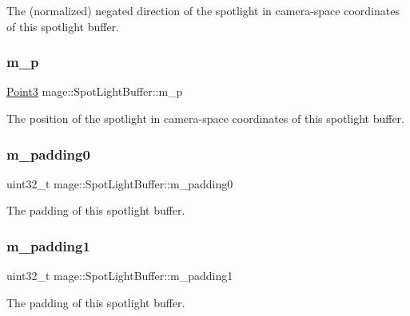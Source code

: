 The (normalized) negated direction of the spotlight in camera-\/space coordinates of this spotlight buffer. \hypertarget{structmage_1_1_spot_light_buffer_a6cb32b6089b90aa937df99bb794884e3}{}\label{structmage_1_1_spot_light_buffer_a6cb32b6089b90aa937df99bb794884e3} 
\subsubsection{\texorpdfstring{m\+\_\+p}{m\_p}}
{\footnotesize\ttfamily \hyperlink{structmage_1_1_point3}{Point3} mage\+::\+Spot\+Light\+Buffer\+::m\+\_\+p}

The position of the spotlight in camera-\/space coordinates of this spotlight buffer. \hypertarget{structmage_1_1_spot_light_buffer_a8a5110d1427ca192cee7751ae8aeabab}{}\label{structmage_1_1_spot_light_buffer_a8a5110d1427ca192cee7751ae8aeabab} 
\subsubsection{\texorpdfstring{m\+\_\+padding0}{m\_padding0}}
{\footnotesize\ttfamily uint32\+\_\+t mage\+::\+Spot\+Light\+Buffer\+::m\+\_\+padding0}

The padding of this spotlight buffer. \hypertarget{structmage_1_1_spot_light_buffer_a60369775901f4536a28cc35ab2275bd8}{}\label{structmage_1_1_spot_light_buffer_a60369775901f4536a28cc35ab2275bd8} 
\subsubsection{\texorpdfstring{m\+\_\+padding1}{m\_padding1}}
{\footnotesize\ttfamily uint32\+\_\+t mage\+::\+Spot\+Light\+Buffer\+::m\+\_\+padding1}

The padding of this spotlight buffer. 